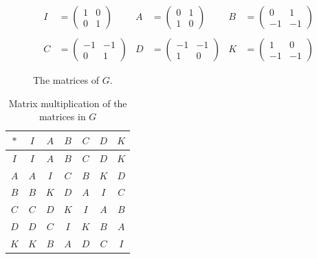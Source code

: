 \documentclass[twoside]{amsart}
\begin{document}
\begin{enumerate}[A.]
   \begin{figure}
   \caption{The matrices of $G$.}
   \label{tab:matrices}
   \begin{align*}
     I & = \left( \begin{array}{rr} 
              1 & 0 \\ 
	      0 & 1
	   \end{array} \right) & 
     A & = \left( \begin{array}{rr}
              0 & 1 \\
	      1 & 0
	   \end{array} \right)  &
     B & = \left( \begin{array}{rr}
              0 & 1 \\
	      -1 & -1
	   \end{array}  \right) \\ \\
     C & = \left( \begin{array}{rr}
              -1 & -1 \\
	       0 &  1
	   \end{array} \right) &
     D & = \left( \begin{array}{rr}
              -1 & -1 \\
	       1 &  0
	   \end{array} \right) &
     K & = \left( \begin{array}{rr}
               1 &  0 \\
	      -1 & -1
	   \end{array} \right)
   \end{align*}
   \end{figure}

   \begin{table}
   \caption{Matrix multiplication of the matrices in $G$}
   \label{tab:matmult}
   \begin{tabular}{c|cccccc}
     $*$ & $I$ & $A$ & $B$ & $C$ & $D$ & $K$ \\ \hline
     $I$ & $I$ & $A$ & $B$ & $C$ & $D$ & $K$ \\
     $A$ & $A$ & $I$ & $C$ & $B$ & $K$ & $D$ \\
     $B$ & $B$ & $K$ & $D$ & $A$ & $I$ & $C$ \\
     $C$ & $C$ & $D$ & $K$ & $I$ & $A$ & $B$ \\
     $D$ & $D$ & $C$ & $I$ & $K$ & $B$ & $A$ \\
     $K$ & $K$ & $B$ & $A$ & $D$ & $C$ & $I$
   \end{tabular}
   \end{table}
   

\end{enumerate}
\end{document}
